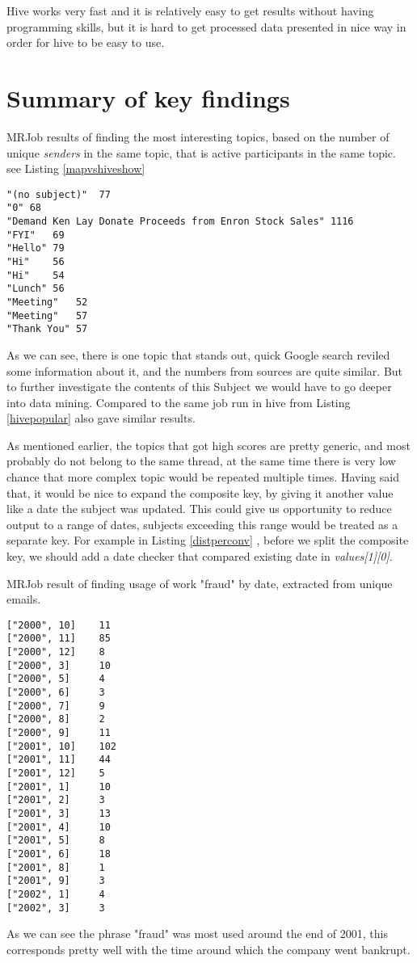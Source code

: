 \documentclass{llncs}
\begin{document}
Hive works very fast and it is relatively easy to get results without having programming skills, but it is hard to get processed data presented in nice way in order for hive to be easy to use.

\section{Summary of key findings}

MRJob results of finding the most interesting topics, based on the number of unique \emph{senders} in the same topic, that is active participants in the same topic. see Listing \ref{mapvshiveshow}
\begin{lstlisting}[caption={Output from similar task performed in Hive in Listing \ref{hivepopular}}, label={mapvshiveshow}]
"(no subject)"	77
"0"	68
"Demand Ken Lay Donate Proceeds from Enron Stock Sales"	1116
"FYI"	69
"Hello"	79
"Hi"	56
"Hi"	54
"Lunch"	56
"Meeting"	52
"Meeting"	57
"Thank You"	57
\end{lstlisting}
As we can see, there is one topic that stands out, quick Google search reviled some information about it, and the numbers from sources \cite{demankeylay} are quite similar. But to further investigate the contents of this Subject we would have to go deeper into data mining. Compared to the same job run in hive from Listing \ref{hivepopular} also gave similar results.

As mentioned earlier, the topics that got high scores are pretty generic, and most probably do not belong to the same thread, at the same time there is very low chance that more complex topic would be repeated multiple times. Having said that, it would be nice to expand the composite key, by giving it another value like a date the subject was updated. This could give us opportunity to reduce output to a range of dates, subjects exceeding this range would be treated as a separate key. For example in Listing \ref{distperconv} , before we split the composite key, we should add a date checker that compared existing date in \emph{values[1][0]}.


MRJob result of finding usage of work "fraud" by date, extracted from unique emails.
\begin{lstlisting}[caption={Output of counting all frequency of usage of word "fraud" in distinct emails\, by date}, label={fraudfreq}]
["2000", 10]	11
["2000", 11]	85
["2000", 12]	8
["2000", 3]		10
["2000", 5]		4
["2000", 6]		3
["2000", 7]		9
["2000", 8]		2
["2000", 9]		11
["2001", 10]	102
["2001", 11]	44
["2001", 12]	5
["2001", 1]		10
["2001", 2]		3
["2001", 3]		13
["2001", 4]		10
["2001", 5]		8
["2001", 6]		18
["2001", 8]		1
["2001", 9]		3
["2002", 1]		4
["2002", 3]		3
\end{lstlisting}
As we can see the phrase "fraud" was most used around the end of 2001, this corresponds pretty well with the time around which the company went bankrupt.
\end{document}
